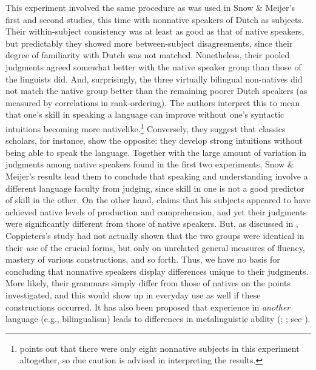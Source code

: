 This experiment involved the same procedure as was used in Snow \& Meijer's first and second studies, this time with nonnative speakers of Dutch as subjects. Their within-subject consistency was at least as good as that of native speakers, but predictably they showed more between-subject disagreements, since their degree of familiarity with Dutch was not matched. Nonetheless, their pooled judgments agreed somewhat better with the native speaker group than those of the linguists did. And, surprisingly, the three virtually bilingual non-natives did not match the native group better than the remaining poorer Dutch speakers (as measured by correlations in rank-ordering). The authors interpret this to mean that one's skill in speaking a language can improve without one's syntactic intuitions becoming more nativelike.\footnote{\citet{Chaudron1983} points out that there were only eight nonnative subjects in this experiment altogether, so due caution is advised in interpreting the results.}
 Conversely, they suggest that classics scholars, for instance, show the opposite: they develop strong intuitions without being able to speak the language. Together with the large amount of variation in judgments among native speakers found in the first two experiments, Snow \& Meijer's results lead them to conclude that speaking and understanding involve a different language faculty from judging, since skill in one is not a good predictor of skill in the other. On the other hand, \citet{Coppieters1987} claims that his subjects appeared to have achieved native levels of production and comprehension, and yet their judgments were significantly different from those of native speakers. But, as discussed in , Coppieters's study had not actually shown that the two groups were identical in their \textit{use} of the crucial forms, but only on unrelated general measures of fluency, mastery of various constructions, and so forth. Thus, we have no basis for concluding that nonnative speakers display differences unique to their judgments. More likely, their grammars simply differ from those of natives on the points investigated, and this would show up in everyday use as well if these constructions occurred. It has also been proposed that experience in \textit{another} language (e.g., bilingualism) leads to differences in metalinguistic ability (\citealt{VanKleeck1982}; \citealt{Bialystok1986}; see ).

